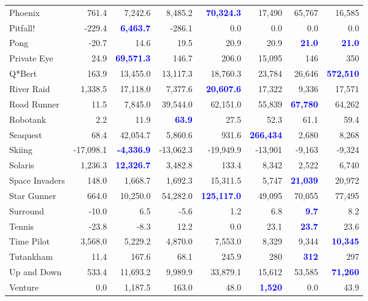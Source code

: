 \documentclass[letterpaper]{article}
\begin{document}
\begin{figure}
\begin{tabular}{ l | r|r|r|r|r|r| r }
Phoenix & 761.4 & 7,242.6 & 8,485.2 & \textbf{\textcolor{blue}{70,324.3}} & 17,490 & 65,767 & 16,585 \\
Pitfall! & -229.4 & \textbf{\textcolor{blue}{6,463.7}} & -286.1 & 0.0 & 0.0 & 0.0 & 0.0 \\
Pong & -20.7 & 14.6 & 19.5 & 20.9 & 20.9 & \textbf{\textcolor{blue}{21.0}} & \textbf{\textcolor{blue}{21.0}} \\
Private Eye & 24.9 & \textbf{\textcolor{blue}{69,571.3}} & 146.7 & 206.0 & 15,095 & 146 & 350 \\
Q*Bert & 163.9 & 13,455.0 & 13,117.3 & 18,760.3 & 23,784 & 26,646 & \textbf{\textcolor{blue}{572,510}} \\
River Raid & 1,338.5 & 17,118.0 & 7,377.6 & \textbf{\textcolor{blue}{20,607.6}} & 17,322 & 9,336 & 17,571 \\
Road Runner & 11.5 & 7,845.0 & 39,544.0 & 62,151.0 & 55,839 & \textbf{\textcolor{blue}{67,780}} & 64,262 \\
Robotank & 2.2 & 11.9 & \textbf{\textcolor{blue}{63.9}} & 27.5 & 52.3 & 61.1 & 59.4 \\
Seaquest & 68.4 & 42,054.7 & 5,860.6 & 931.6 & \textbf{\textcolor{blue}{266,434}} & 2,680 & 8,268 \\
Skiing & -17,098.1 & \textbf{\textcolor{blue}{-4,336.9}} & -13,062.3 & -19,949.9 & -13,901 & -9,163 & -9,324 \\
Solaris & 1,236.3 & \textbf{\textcolor{blue}{12,326.7}} & 3,482.8 & 133.4 & 8,342 & 2,522 & 6,740 \\
Space Invaders & 148.0 & 1,668.7 & 1,692.3 & 15,311.5 & 5,747 & \textbf{\textcolor{blue}{21,039}} & 20,972 \\
Star Gunner & 664.0 & 10,250.0 & 54,282.0 & \textbf{\textcolor{blue}{125,117.0}} & 49,095 & 70,055 & 77,495 \\
Surround & -10.0 & 6.5 & -5.6 & 1.2 & 6.8 & \textbf{\textcolor{blue}{9.7}} & 8.2 \\
Tennis & -23.8 & -8.3 & 12.2 & 0.0 & 23.1 & \textbf{\textcolor{blue}{23.7}} & 23.6 \\
Time Pilot & 3,568.0 & 5,229.2 & 4,870.0 & 7,553.0 & 8,329 & 9,344 & \textbf{\textcolor{blue}{10,345}} \\
Tutankham & 11.4 & 167.6 & 68.1 & 245.9 & 280 & \textbf{\textcolor{blue}{312}} & 297 \\
Up and Down & 533.4 & 11,693.2 & 9,989.9 & 33,879.1 & 15,612 & 53,585 & \textbf{\textcolor{blue}{71,260}} \\
Venture & 0.0 & 1,187.5 & 163.0 & 48.0 & \textbf{\textcolor{blue}{1,520}} & 0.0 & 43.9 \\

\end{tabular}
\end{figure}
\end{document}
